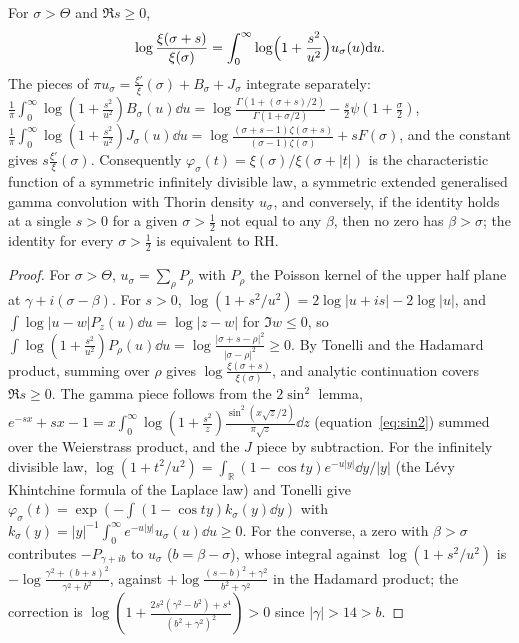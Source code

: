 \begin{theorem}\label{bo:thm:egg}
For $\sigma>\Theta$ and $\Re s\ge0$,
\[
\log\frac{\xi(\sigma+s)}{\xi(\sigma)}=\int_0^\infty\log\Bigl(1+\frac{s^2}{u^2}\Bigr)u_\sigma(u)\mathrm{d} u .
\]
The pieces of $\pi u_\sigma=\frac{\xi'}{\xi}(\sigma)+B_\sigma+J_\sigma$ integrate separately: $\frac1\pi\int_0^\infty\log(1+\frac{s^2}{u^2})B_\sigma(u)\dd u=\log\frac{\Gamma(1+(\sigma+s)/2)}{\Gamma(1+\sigma/2)}-\frac s2\psi(1+\frac\sigma2)$, $\frac1\pi\int_0^\infty\log(1+\frac{s^2}{u^2})J_\sigma(u)\dd u=\log\frac{(\sigma+s-1)\zeta(\sigma+s)}{(\sigma-1)\zeta(\sigma)}+sF(\sigma)$, and the constant gives $s\frac{\xi'}{\xi}(\sigma)$. Consequently $\varphi_\sigma(t)=\xi(\sigma)/\xi(\sigma+|t|)$ is the characteristic function of a symmetric infinitely divisible law, a symmetric extended generalised gamma convolution with Thorin density $u_\sigma$, and conversely, if the identity holds at a single $s>0$ for a given $\sigma>\frac12$ not equal to any $\beta$, then no zero has $\beta>\sigma$; the identity for every $\sigma>\frac12$ is equivalent to RH.
\end{theorem}

\begin{proof}
For $\sigma>\Theta$, $u_\sigma=\sum_\rho P_\rho$ with $P_\rho$ the Poisson kernel of the upper half plane at $\gamma+i(\sigma-\beta)$. For $s>0$, $\log(1+s^2/u^2)=2\log|u+is|-2\log|u|$, and $\int\log|u-w|P_z(u)\dd u=\log|z-w|$ for $\Im w\le0$, so $\int\log(1+\frac{s^2}{u^2})P_\rho(u)\dd u=\log\frac{|\sigma+s-\rho|^2}{|\sigma-\rho|^2}\ge0$. By Tonelli and the Hadamard product, summing over $\rho$ gives $\log\frac{\xi(\sigma+s)}{\xi(\sigma)}$, and analytic continuation covers $\Re s\ge0$. The gamma piece follows from the $2\sin^2$ lemma, $e^{-sx}+sx-1=x\int_0^\infty\log(1+\frac{s^2}z)\frac{\sin^2(x\sqrt z/2)}{\pi\sqrt z}\dd z$ (equation~\eqref{eq:sin2}) summed over the Weierstrass product, and the $J$ piece by subtraction. For the infinitely divisible law, $\log(1+t^2/u^2)=\int_{\mathbb R}(1-\cos ty)e^{-u|y|}\dd y/|y|$ (the L\'evy Khintchine formula of the Laplace law) and Tonelli give $\varphi_\sigma(t)=\exp(-\int(1-\cos ty)k_\sigma(y)\dd y)$ with $k_\sigma(y)=|y|^{-1}\int_0^\infty e^{-u|y|}u_\sigma(u)\dd u\ge0$. For the converse, a zero with $\beta>\sigma$ contributes $-P_{\gamma+ib}$ to $u_\sigma$ ($b=\beta-\sigma$), whose integral against $\log(1+s^2/u^2)$ is $-\log\frac{\gamma^2+(b+s)^2}{\gamma^2+b^2}$, against $+\log\frac{(s-b)^2+\gamma^2}{b^2+\gamma^2}$ in the Hadamard product; the correction is $\log(1+\frac{2s^2(\gamma^2-b^2)+s^4}{(b^2+\gamma^2)^2})>0$ since $|\gamma|>14>b$.
\end{proof}

